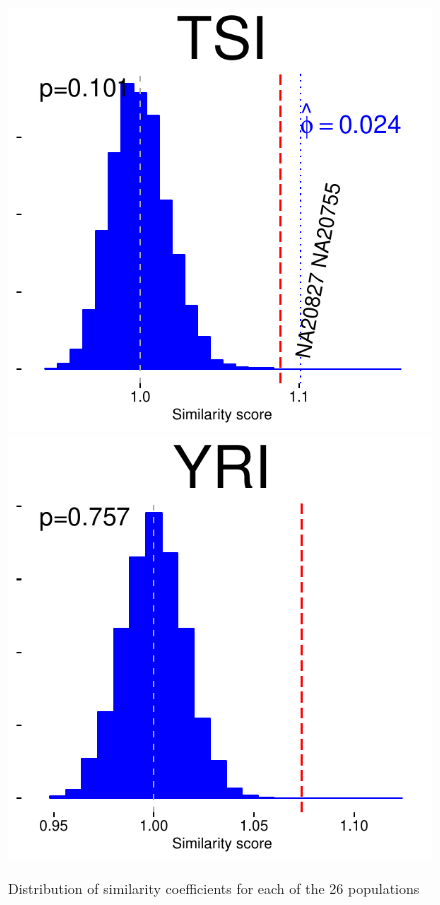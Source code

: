 \begin{figure}
\includegraphics[width=0.12\paperwidth]{figures/PostFilter/TSIdiploid}\includegraphics[width=0.12\paperwidth]{figures/PostFilter/YRIdiploid}\caption{Distribution of similarity coefficients for each of the 26 populations
}
\end{figure}
